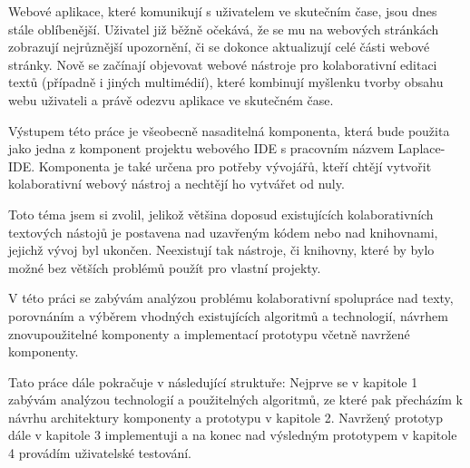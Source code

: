 \begin{introduction}

    Webové aplikace, které komunikují s uživatelem ve skutečním čase, jsou dnes stále oblíbenější.
    Uživatel již běžně očekává, že se mu na webových stránkách zobrazují nejrůznější upozornění, či se dokonce aktualizují celé části webové stránky.
    Nově se začínají objevovat webové nástroje pro kolaborativní editaci textů (případně i jiných multimédií), které kombinují myšlenku tvorby obsahu webu uživateli a právě odezvu aplikace ve skutečném čase.

    Výstupem této práce je všeobecně nasaditelná komponenta, která bude použita jako jedna z komponent projektu webového IDE s pracovním názvem Laplace-IDE.
    Komponenta je také určena pro potřeby vývojářů, kteří chtějí vytvořit kolaborativní webový nástroj a nechtějí ho vytvářet od nuly.

    Toto téma jsem si zvolil, jelikož většina doposud existujících kolaborativních textových nástojů je postavena nad uzavřeným kódem nebo nad knihovnami, jejichž vývoj byl ukončen.
    Neexistují tak nástroje, či knihovny, které by bylo možné bez větších problémů použít pro vlastní projekty.

    V této práci se zabývám analýzou problému kolaborativní spolupráce nad texty, porovnáním a výběrem vhodných existujících algoritmů a technologií, návrhem znovupoužitelné komponenty a implementací prototypu včetně navržené komponenty.

    Tato práce dále pokračuje v následující struktuře:
    Nejprve se v kapitole 1 zabývám analýzou technologií a použitelných algoritmů, ze které pak přecházím k návrhu architektury komponenty a prototypu v kapitole 2.
    Navržený prototyp dále v kapitole 3 implementuji a na konec nad výsledným prototypem v kapitole 4 provádím uživatelské testování.

\end{introduction}
